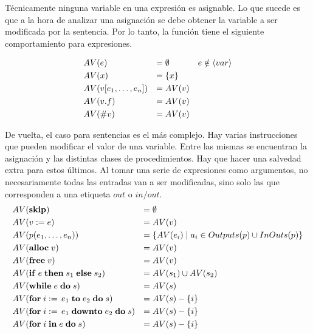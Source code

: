\documentclass{article}
\begin{document}
Técnicamente ninguna variable en una expresión es asignable.
Lo que sucede es que a la hora de analizar una asignación se debe obtener la variable a ser modificada por la sentencia.
Por lo tanto, la función tiene el siguiente comportamiento para expresiones.


\begin{align*}
&AV(e)
&=&\;
\emptyset
&e \notin \langle var \rangle
\\
&AV(x)
&=&\;
\{ x \}
\\
&AV(v [e_1, \ldots, e_n])
&=&\;
AV(v)
\\
&AV(v.f)
&=&\;
AV(v)
\\
&AV(\# v)
&=&\;
AV(v)
\end{align*}



De vuelta, el caso para sentencias es el más complejo.
Hay varias instrucciones que pueden modificar el valor de una variable.
Entre las mismas se encuentran la asignación y las distintas clases de procedimientos.
Hay que hacer una salvedad extra para estos últimos.
Al tomar una serie de expresiones como argumentos, no necesariamente todas las entradas van a ser modificadas, sino solo las que corresponden a una etiqueta $out$ o $in/out$.
\begin{align*}
&AV(\mathbf{skip})
&=&\;
\emptyset
\\
&AV(v := e)
&=&\;
AV(v)
\\
&AV(p(e_1, \ldots, e_n))
&=&\;
\{ AV(e_i) \mid a_i \in Outputs(p) \cup InOuts(p) \}
\\
&AV(\mathbf{alloc} \; v)
&=&\;
AV(v)
\\
&AV(\mathbf{free} \; v)
&=&\;
AV(v)
\\
&AV(\mathbf{if} \; e \; \mathbf{then} \; s_1 \; \mathbf{else} \; s_2)
&=&\;
AV(s_1) \cup AV(s_2)
\\
&AV(\mathbf{while} \; e \; \mathbf{do} \; s)
&=&\;
AV(s)
\\
&AV(\mathbf{for} \; i := \, e_1 \; \mathbf{to} \; e_2 \; \mathbf{do} \; s)
&=&\;
AV(s) - \{ i \}
\\
&AV(\mathbf{for} \; i := \, e_1 \; \mathbf{downto} \; e_2 \; \mathbf{do} \; s)
&=&\;
AV(s) - \{ i \}
\\
&AV(\mathbf{for} \; i \; \mathbf{in} \; e \; \mathbf{do} \; s)
&=&\;
AV(s) - \{ i \}
\end{align*}
\end{document}
